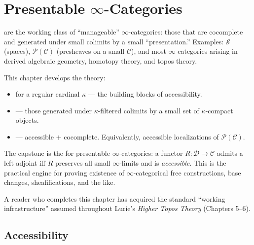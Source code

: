 
\chapter{Presentable $\infty$-Categories}

\begin{overviewbox}
 are the working class of
``manageable'' $\infty$-categories: those that are cocomplete and
generated under small colimits by a small ``presentation.'' Examples:
$\mathcal{S}$ (spaces), $\mathcal{P}(\mathcal{C})$ (presheaves on a
small $\mathcal{C}$), and most $\infty$-categories arising in derived
algebraic geometry, homotopy theory, and topos theory.

This chapter develops the theory:
\begin{itemize}
  \item {} for a regular cardinal
        $\kappa$ — the building blocks of accessibility.
  \item {} — those generated under
        $\kappa$-filtered colimits by a small set of $\kappa$-compact
        objects.
  \item {} — accessible $+$
        cocomplete. Equivalently, accessible localizations of $\mathcal{P}(\mathcal{C})$.
\end{itemize}

The capstone is the  for
presentable $\infty$-categories: a functor $R : \mathcal{D} \to
\mathcal{C}$ admits a left adjoint iff $R$ preserves all small
$\infty$-limits and is \emph{accessible}. This is the practical engine
for proving existence of $\infty$-categorical free constructions, base
changes, sheafifications, and the like.

A reader who completes this chapter has acquired the standard ``working
infrastructure'' assumed throughout Lurie's \emph{Higher Topos Theory}
(Chapters 5–6).
\end{overviewbox}


\section{Accessibility}
\label{sec:accessibility}

